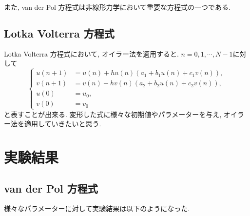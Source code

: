 \documentclass[12pt,a4paper]{jsarticle}
\begin{document}
また, van der Pol 方程式は非線形力学において重要な方程式の一つである. 

\subsection{Lotka Volterra 方程式}
Lotka Volterra 方程式において, オイラー法を適用すると. $n = 0, 1, \cdots , N-1$に対して
\begin{equation*}
	\left\{
	\begin{aligned}
		u(n+1) &= u(n) + hu(n)(a_1 + b_1u(n) + c_1v(n)), \\
		v(n+1) &= v(n) + hv(n)(a_2 + b_2u(n) + c_2v(n)), \\
		u(0) &= u_0, \\
		v(0) &= v_0
	\end{aligned}
	\right.
\end{equation*}
と表すことが出来る. 変形した式に様々な初期値やパラメーターを与え, オイラー法を適用していきたいと思う.

\section{実験結果}
\subsection{van der Pol 方程式}
様々なパラメーターに対して実験結果は以下のようになった.
\end{document}
